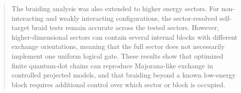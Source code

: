\documentclass[UKenglish]{uiomasterthesis}
\begin{document}
\begin{abstract}
The braiding analysis was also extended to higher energy sectors. For non-interacting and weakly interacting configurations, the sector-resolved self-target braid tests remain accurate across the tested sectors. However, higher-dimensional sectors can contain several internal blocks with different exchange orientations, meaning that the full sector does not necessarily implement one uniform logical gate. These results show that optimized finite quantum-dot chains can reproduce Majorana-like exchange in controlled projected models, and that braiding beyond a known low-energy block requires additional control over which sector or block is occupied.






\end{abstract}
\end{document}
